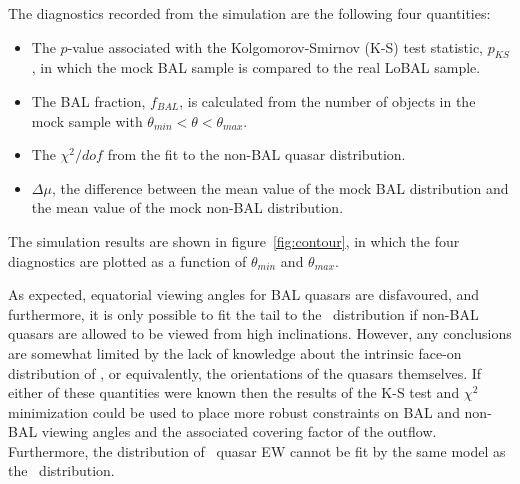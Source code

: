 The diagnostics recorded from the simulation are the following four
quantities:
\begin{itemize}
	\item The $p$-value associated with the Kolgomorov-Smirnov (K-S) 
	test statistic, $p_{KS}$, in which the mock BAL sample is compared
	to the real LoBAL sample.
	\item The BAL fraction, $f_{BAL}$, is calculated from the 
	number of objects in the mock sample with $\theta_{min}<\theta<\theta_{max}$.
	\item The $\chi^2/dof$ from the fit to the non-BAL quasar distribution.
	\item $\Delta \mu$, the difference between the mean value of the mock BAL
	distribution and the mean value of the mock non-BAL distribution.
\end{itemize}
The simulation results are shown in figure~\ref{fig:contour}, in which the 
four diagnostics are plotted as a function of $\theta_{min}$ 
and $\theta_{max}$. 

As expected, equatorial viewing angles for BAL quasars 
are disfavoured, and furthermore, it is only possible to fit
the tail to the \ewo\ distribution if non-BAL quasars are allowed 
to be viewed from high inclinations. However, any conclusions
are somewhat limited by the lack of knowledge about the 
intrinsic face-on distribution of \ewo, or equivalently,
the orientations of the quasars themselves. If either of these
quantities were known then the results of the
K-S test and $\chi^2$ minimization could be used
to place more robust constraints on BAL and non-BAL viewing angles 
and the associated covering factor of the outflow.
Furthermore, the distribution of \civ\ quasar EW cannot be fit by 
the same model as the \ewo\ distribution.


